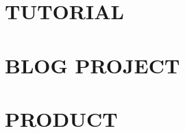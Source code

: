 \documentclass[10pt]{book}
\begin{document}

\frontmatter

\tableofcontents
\mainmatter

\part{TUTORIAL}











\part{BLOG PROJECT}









\part{PRODUCT}






\backmatter
\end{document}

